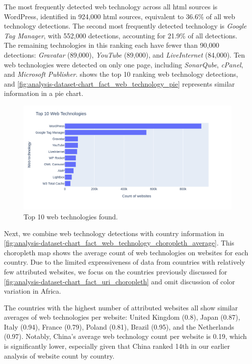 The most frequently detected web technology across all \ac{html} sources is WordPress, identified in 924,000 \ac{html} sources, equivalent to 36.6\% of all web technology detections.
The second most frequently detected technology is \textit{Google Tag Manager}, with 552,000 detections, accounting for 21.9\% of all detections.
The remaining technologies in this ranking each have fewer than 90,000 detections: \textit{Gravatar} (89,000), \textit{YouTube} (89,000), and \textit{LiveInternet} (84,000).
Ten web technologies were detected on only one page, including \textit{SonarQube}, \textit{cPanel}, and \textit{Microsoft Publisher}.
 shows the top 10 ranking web technology detections, and \cref{fig:analysis-dataset-chart_fact_web_technology_pie} represents similar information in a pie chart.

\begin{figure}[H]
    \centering
    \includegraphics[width=\textwidth]{figures/charts/large/chart_fact_web_technology_bar_top_10.png}
    \caption{Top 10 web technologies found.}
    \label{fig:analysis-dataset-chart_fact_web_technology_bar_top_10}
\end{figure}

Next, we combine web technology detections with country information in \cref{fig:analysis-dataset-chart_fact_web_technology_choropleth_average}.
This choropleth map shows the average count of web technologies on websites for each country.
Due to the limited expressiveness of data from countries with relatively few attributed websites, we focus on the countries previously discussed for \cref{fig:analysis-dataset-chart_fact_uri_choropleth} and omit discussion of color variation in Africa.

The countries with the highest number of attributed websites all show similar averages of web technologies per website: United Kingdom (0.8), Japan (0.87), Italy (0.94), France (0.79), Poland (0.81), Brazil (0.95), and the Netherlands (0.97).
Notably, China's average web technology count per website is 0.19, which is significantly lower, especially given that China ranked 14th in our earlier analysis of website count by country.

